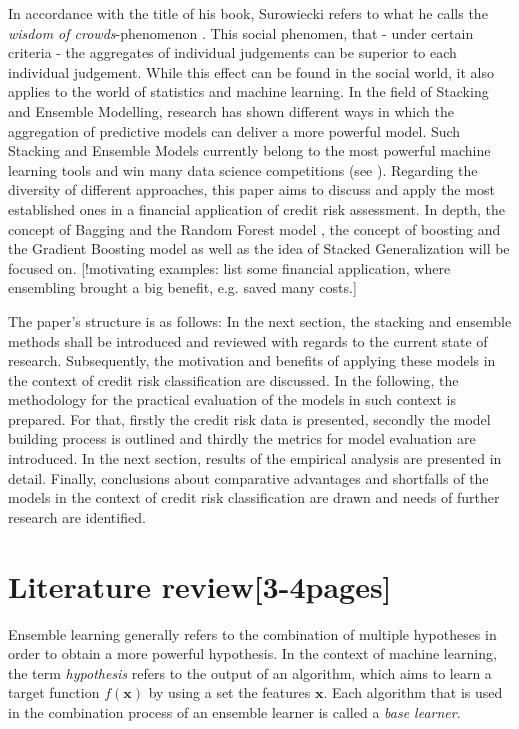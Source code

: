 \documentclass[12pt]{article}
\begin{document}
In accordance with the title of his book, Surowiecki refers to what he calls the \textit{wisdom of crowds}-phenomenon \cite{surowiecki2005wisdom}. This social phenomen, that - under certain criteria - the aggregates of individual judgements can be superior to each individual judgement. While this effect can be found in the social world, it also applies to the world of statistics and machine learning. In the field of Stacking and Ensemble Modelling, research has shown different ways in which the aggregation of predictive models can deliver a more powerful model. Such Stacking and Ensemble Models currently belong to the most powerful machine learning tools and win many data science competitions (see \citeauthor{kaggle}). Regarding the diversity of different approaches, this paper aims to discuss and apply the most established ones in a financial application of credit risk assessment. In depth, the concept of Bagging and the Random Forest model \citep{breiman1996bagging, breiman2001random}, the concept of boosting and the Gradient Boosting model \cite{freund1996experiments, friedman2002stochastic} as well as the idea of Stacked Generalization \citep{wolpert1992stacked} will be focused on. [!motivating examples: list some financial application, where ensembling brought a big benefit, e.g. saved many costs.]

The paper's structure is as follows: In the next section, the stacking and ensemble methods shall be introduced and reviewed with regards to the current state of research. Subsequently, the motivation and benefits of applying these models in the context of credit risk classification are discussed. In the following, the methodology for the practical evaluation of the models in such context is prepared.  For that, firstly the credit risk data is presented, secondly the model building process is outlined and thirdly the metrics for model evaluation are introduced. In the next section, results of the empirical analysis are presented in detail. Finally, conclusions about comparative advantages and shortfalls of the models in the context of credit risk classification are drawn and needs of further research are identified.


\section{Literature review[3-4pages]}
Ensemble learning generally refers to the combination of multiple hypotheses in order to obtain a more powerful hypothesis. In the context of machine learning, the term \textit{hypothesis} refers to the output of an algorithm, which aims to learn a target function $f(\mathbf{x})$ by using a set the features $\mathbf{x}$. Each algorithm that is used in the combination process of an ensemble learner is called a \textit{base learner}.
\end{document}
